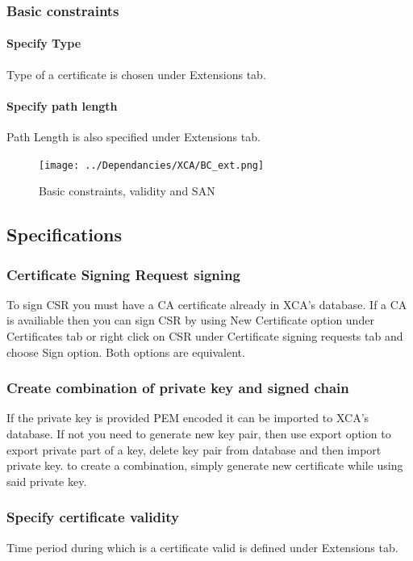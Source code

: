 \documentclass[10pt, a4paper]{report}
\begin{document}
    \subsubsection{Basic constraints}
    
      \paragraph{Specify Type}
Type of a certificate is chosen under Extensions tab.
      \paragraph{Specify path length}
Path Length is also specified under Extensions tab.

\begin{figure}[!ht]
 \caption{Basic constraints, validity and SAN}
 \centering
  \texttt{[image: ../Dependancies/XCA/BC\_ext.png]}
\end{figure}

  \subsection{Specifications}
  
    \subsubsection{Certificate Signing Request signing}
To sign CSR you must have a CA certificate already in XCA's database. If a CA is availiable then you can sign CSR by using New Certificate option under Certificates tab or right click on CSR under Certificate signing requests tab and choose Sign option. Both options are equivalent.    
    \subsubsection{Create combination of private key and signed chain}
If the private key is provided PEM encoded it can be imported to XCA's database. If not you need to generate new key pair, then use export option to export private part of a key, delete key pair from database and then import private key. to create a combination, simply generate new certificate while using said private key.
    \subsubsection{Specify certificate validity}
Time period during which is a certificate valid is defined under Extensions tab.
\end{document}
